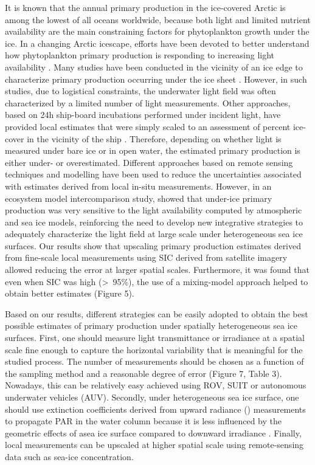 It is known that the annual primary production in the ice-covered Arctic is among the lowest of all oceans worldwide, because both light and limited nutrient availability are the main constraining  factors for phytoplankton growth under the ice. In a changing Arctic icescape, efforts have been devoted to better understand how phytoplankton primary production is responding to increasing light availability \citep{Fernandez-Mendez2015, Vancoppenolle2013}. Many studies have been conducted in the vicinity of an ice edge to characterize primary production occurring under the ice sheet \citep{Arrigo2012, Arrigo2014, Mundy2009}. However, in such studies, due to logistical constraints, the underwater light field was often characterized by a limited number of light measurements. Other approaches, based on 24h ship-board incubations performed under incident light, have provided local estimates that were simply scaled to an assessment of percent ice-cover in the vicinity of the ship \citep{Smith1995, Gosselin1997, Mei2003}. Therefore, depending on whether light is measured under bare ice or in open water, the estimated primary production is either under- or overestimated. Different approaches based on remote sensing techniques and modelling have been used to reduce the uncertainties associated with estimates derived from local in-situ measurements. However, in an ecosystem model intercomparison study, \citet{Jin2015} showed that under-ice primary production was very sensitive to the light availability computed by atmospheric and sea ice models, reinforcing the need to develop new integrative strategies to adequately characterize the light field at large scale under heterogeneous sea ice surfaces. Our results show that upscaling primary production estimates derived from fine-scale local measurements using SIC derived from satellite imagery allowed reducing the error at larger spatial scales. Furthermore, it was found that even when SIC was high (\textgreater~95\%), the use of a mixing-model approach helped to obtain better estimates (Figure 5).

Based on our results, different strategies can be easily adopted to obtain the best possible estimates of primary production under spatially heterogeneous sea ice surfaces. First, one should measure light transmittance or irradiance at a spatial scale fine enough to capture the horizontal variability that is meaningful for the studied process. The number of measurements should be chosen as a function of the sampling method and a reasonable degree of error (Figure 7, Table 3). Nowadays, this can be relatively easy achieved using ROV, SUIT or autonomous underwater vehicles (AUV). Secondly, under heterogeneous sea ice surface, one should use extinction coefficients derived from upward radiance (\lu{}) measurements to propagate PAR in the water column because it is less influenced by the geometric effects of asea ice surface compared to downward irradiance \citep{Katlein2016, Massicotte2018}. Finally, local measurements can be upscaled at higher spatial scale using remote-sensing data such as sea-ice concentration.